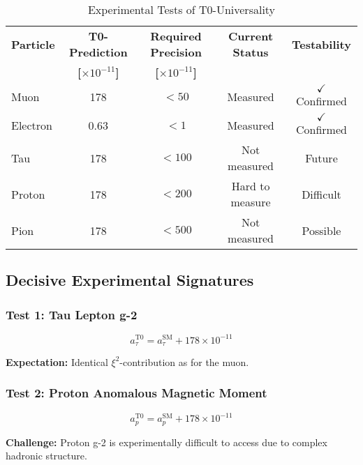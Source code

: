 \documentclass[12pt,a4paper]{article}
\newcommand{\xipar}{\xi}
\begin{document}
	\begin{table}[H]
		\centering
		\caption{Experimental Tests of T0-Universality}
		\begin{tabular}{@{}lcccc@{}}
			\toprule
			\textbf{Particle} & \textbf{T0-Prediction} & \textbf{Required Precision} & \textbf{Current Status} & \textbf{Testability} \\
			& \textbf{[$\times 10^{-11}$]} & \textbf{[$\times 10^{-11}$]} & & \\
			\midrule
			\rowcolor{green!30}
			Muon & 178 & $< 50$ & Measured & $\checkmark$ Confirmed \\
			\rowcolor{green!30}
			Electron & 0.63 & $< 1$ & Measured & $\checkmark$ Confirmed \\
			\rowcolor{yellow!20}
			Tau & 178 & $< 100$ & Not measured & Future \\
			\rowcolor{blue!10}
			Proton & 178 & $< 200$ & Hard to measure & Difficult \\
			\rowcolor{blue!10}
			Pion & 178 & $< 500$ & Not measured & Possible \\
			\bottomrule
		\end{tabular}
	\end{table}
	
	\subsection{Decisive Experimental Signatures}
	
	\subsubsection{Test 1: Tau Lepton g-2}
	
	\begin{equation}
		a_\tau^{\text{T0}} = a_\tau^{\text{SM}} + 178 \times 10^{-11}
	\end{equation}
	
	\textbf{Expectation:} Identical $\xipar^2$-contribution as for the muon.
	
	\subsubsection{Test 2: Proton Anomalous Magnetic Moment}
	
	\begin{equation}
		a_p^{\text{T0}} = a_p^{\text{SM}} + 178 \times 10^{-11}
	\end{equation}
	
	\textbf{Challenge:} Proton g-2 is experimentally difficult to access due to complex hadronic structure.
	
\end{document}

